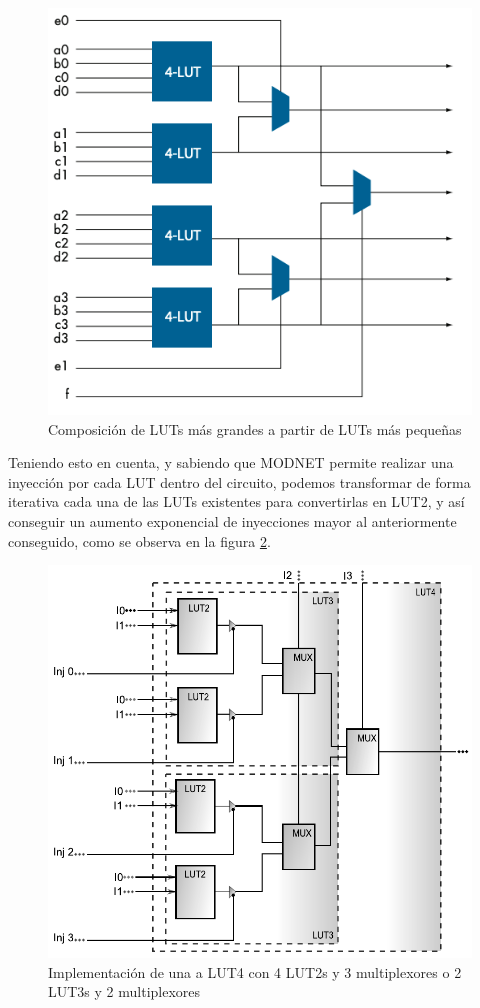 \begin{figure}[H]
	\centering
	\includegraphics[width=0.6 \textwidth]{img/altera_luts_2.png}
	\caption{Composición de LUTs más grandes a partir de LUTs más pequeñas}
	\label{altera_luts_2}
\end{figure}

Teniendo esto en cuenta, y sabiendo que MODNET permite realizar una inyección por cada LUT dentro del circuito, podemos transformar de forma iterativa cada una de las LUTs existentes para convertirlas en LUT2, y así conseguir un aumento exponencial de inyecciones mayor al anteriormente conseguido, como se observa en la figura \ref{lut4_to_lut2}.

\begin{figure}[t]
	\centering
	\includegraphics[width=0.7 \textwidth]{img/Lut4_IN_LUT2.pdf}
	\caption{Implementación de una a LUT4 con 4 LUT2s y 3 multiplexores o 2 LUT3s y 2 multiplexores}
	\label{lut4_to_lut2}
\end{figure}